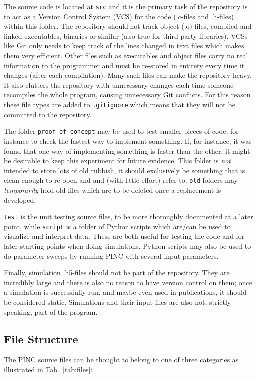 \documentclass[10pt,a4paper]{article}
\newcommand{\reftab}[1]{Tab.~\ref{tab:#1}}
\begin{document}
The source code is located at \verb$src$ and it is the primary task of the repository is to act as a Version Control System (VCS) for the code (.c-files and .h-files) within this folder. The repository should not track object (.o) files, compiled and linked executables, binaries or similar (also true for third party libraries). VCSs like Git only needs to keep track of the lines changed in text files which makes them very efficient. Other files such as executables and object files carry no real information to the programmer and must be re-stored in entirety every time it changes (after each compilation). Many such files can make the repository heavy. It also clutters the repository with unnecessary changes each time someone recompiles the whole program, causing unnecessary Git conflicts. For this reason these file types are added to \verb$.gitignore$ which means that they will not be committed to the repository.

The folder \verb$proof of concept$ may be used to test smaller pieces of code, for instance to check the fastest way to implement something. If, for instance, it was found that one way of implementing something is faster than the other, it might be desirable to keep this experiment for future evidence. This folder is \emph{not} intended to store lots of old rubbish, it should exclusively be something that is clean enough to re-open and and (with little effort) refer to. \verb$old$ folders may \emph{temporarily} hold old files which are to be deleted once a replacement is developed.

\verb$test$ is the unit testing source files, to be more thoroughly documented at a later point, while \verb$script$ is a folder of Python scripts which are/can be used to visualize and interpret data. These are both useful for testing the code and for later starting points when doing simulations. Python scripts may also be used to do parameter sweeps by running PINC with several input parameters.

Finally, simulation .h5-files should not be part of the repository. They are incredibly large and there is also no reason to have version control on them; once a simulation is successfully run, and maybe even used in publications, it should be considered static. Simulations and their input files are also not, strictly speaking, part of the program.

\subsection{File Structure}
The PINC source files can be thought to belong to one of three categories as illustrated in \reftab{files}:
\end{document}
